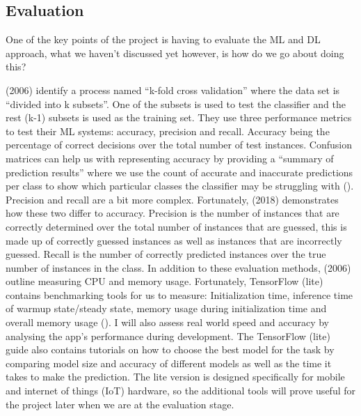 \documentclass{article}
\begin{document}
\subsection{Evaluation}

One of the key points of the project is having to evaluate the ML and DL approach, what we haven't discussed 
yet however, is how do we go about doing this?

\par

\citeauthor{10.1145/1163593.1163596} (2006) identify a process named “k-fold cross validation” where the data set is 
“divided into k subsets”. One of the subsets is used to test the classifier and the rest (k-1) subsets is used as the 
training set. They use three performance metrics to test their ML systems: accuracy, precision and recall. Accuracy 
being the percentage of correct decisions over the total number of test instances. Confusion matrices can help us with 
representing accuracy by providing a “summary of prediction results” where we use the count of accurate and inaccurate 
predictions per class to show which particular classes the classifier may be struggling with (\cite{Brownlee2020b}). 
Precision and recall are a bit more complex. 
Fortunately, \citeauthor{shung2018} (2018) demonstrates how these two differ to accuracy. Precision is the number of 
instances that are correctly determined over the total number of instances that are guessed, this is made up of 
correctly guessed instances as well as instances that are incorrectly guessed. Recall is the number of correctly 
predicted instances over the true number of instances in the class. In addition to these evaluation methods, 
\citeauthor{10.1145/1163593.1163596} (2006) outline measuring CPU and memory usage. Fortunately, TensorFlow (lite) 
contains benchmarking tools for us to measure: Initialization time, inference time of warmup state/steady state, memory 
usage during initialization time and overall memory usage (\cite{googleTF}). I will also assess real world speed and 
accuracy by analysing the app's performance during development. The TensorFlow (lite) guide also contains tutorials on 
how to choose the best model for the task by comparing model size and accuracy of different models as well as the time 
it takes to make the prediction. The lite version is designed specifically for mobile and internet of things (IoT) 
hardware, so the additional tools will prove useful for the project later when we are at the evaluation stage.

\par
\end{document}
